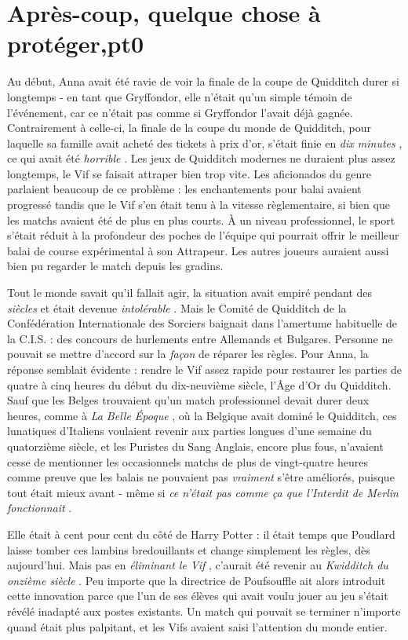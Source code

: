 
\chapter{Après-coup, quelque chose à protéger,pt0}

Au début, Anna avait été ravie de voir la finale de la coupe de Quidditch durer si longtemps - en tant que Gryffondor, elle n'était qu'un simple témoin de l'événement, car ce n'était pas comme si Gryffondor l'avait déjà gagnée. Contrairement à celle-ci, la finale de la coupe du monde de Quidditch, pour laquelle sa famille avait acheté des tickets à prix d'or, s'était finie en \emph{dix minutes} , ce qui avait été \emph{horrible} . Les jeux de Quidditch modernes ne duraient plus assez longtemps, le Vif se faisait attraper bien trop vite. Les aficionados du genre parlaient beaucoup de ce problème : les enchantements pour balai avaient progressé tandis que le Vif s'en était tenu à la vitesse règlementaire, si bien que les matchs avaient été de plus en plus courts. À un niveau professionnel, le sport s'était réduit à la profondeur des poches de l'équipe qui pourrait offrir le meilleur balai de course expérimental à son Attrapeur. Les autres joueurs auraient aussi bien pu regarder le match depuis les gradins.

Tout le monde savait qu'il fallait agir, la situation avait empiré pendant des \emph{siècles}  et était devenue \emph{intolérable} . Mais le Comité de Quidditch de la Confédération Internationale des Sorciers baignait dans l'amertume habituelle de la C.I.S. : des concours de hurlements entre Allemands et Bulgares. Personne ne pouvait se mettre d'accord sur la \emph{façon}  de réparer les règles. Pour Anna, la réponse semblait évidente : rendre le Vif assez rapide pour restaurer les parties de quatre à cinq heures du début du dix-neuvième siècle, l'Âge d'Or du Quidditch. Sauf que les Belges trouvaient qu'un match professionnel devait durer deux heures, comme à \emph{La Belle Époque} , où la Belgique avait dominé le Quidditch, ces lunatiques d'Italiens voulaient revenir aux parties longues d'une semaine du quatorzième siècle, et les Puristes du Sang Anglais, encore plus fous, n'avaient cesse de mentionner les occasionnels matchs de plus de vingt-quatre heures comme preuve que les balais ne pouvaient pas \emph{vraiment}  s'être améliorés, puisque tout était mieux avant - même si \emph{ce n'était pas comme ça que l'Interdit de Merlin fonctionnait} .

Elle était à cent pour cent du côté de Harry Potter : il était temps que Poudlard laisse tomber ces lambins bredouillants et change simplement les règles, dès aujourd'hui. Mais pas en \emph{éliminant le Vif} , c'aurait été revenir au \emph{Kwidditch du onzième siècle} . Peu importe que la directrice de Poufsouffle ait alors introduit cette innovation parce que l'un de ses élèves qui avait voulu jouer au jeu s'était révélé inadapté aux postes existants. Un match qui pouvait se terminer n'importe quand était plus palpitant, et les Vifs avaient saisi l'attention du monde entier.

